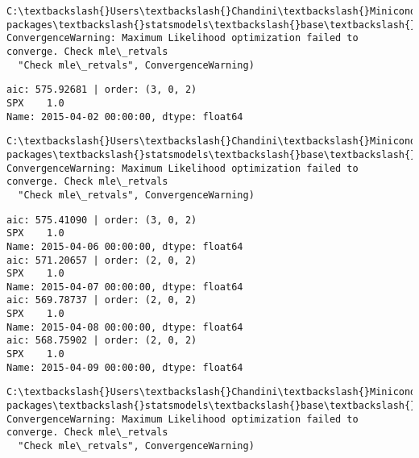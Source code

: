 \documentclass[11pt]{article}
\begin{document}
    \begin{Verbatim}[commandchars=\\\{\}]
C:\textbackslash{}Users\textbackslash{}Chandini\textbackslash{}Miniconda3\textbackslash{}envs\textbackslash{}auquan\textbackslash{}lib\textbackslash{}site-packages\textbackslash{}statsmodels\textbackslash{}base\textbackslash{}model.py:496: ConvergenceWarning: Maximum Likelihood optimization failed to converge. Check mle\_retvals
  "Check mle\_retvals", ConvergenceWarning)

    \end{Verbatim}

    \begin{Verbatim}[commandchars=\\\{\}]
aic: 575.92681 | order: (3, 0, 2)
SPX    1.0
Name: 2015-04-02 00:00:00, dtype: float64

    \end{Verbatim}

    \begin{Verbatim}[commandchars=\\\{\}]
C:\textbackslash{}Users\textbackslash{}Chandini\textbackslash{}Miniconda3\textbackslash{}envs\textbackslash{}auquan\textbackslash{}lib\textbackslash{}site-packages\textbackslash{}statsmodels\textbackslash{}base\textbackslash{}model.py:496: ConvergenceWarning: Maximum Likelihood optimization failed to converge. Check mle\_retvals
  "Check mle\_retvals", ConvergenceWarning)

    \end{Verbatim}

    \begin{Verbatim}[commandchars=\\\{\}]
aic: 575.41090 | order: (3, 0, 2)
SPX    1.0
Name: 2015-04-06 00:00:00, dtype: float64
aic: 571.20657 | order: (2, 0, 2)
SPX    1.0
Name: 2015-04-07 00:00:00, dtype: float64
aic: 569.78737 | order: (2, 0, 2)
SPX    1.0
Name: 2015-04-08 00:00:00, dtype: float64
aic: 568.75902 | order: (2, 0, 2)
SPX    1.0
Name: 2015-04-09 00:00:00, dtype: float64

    \end{Verbatim}

    \begin{Verbatim}[commandchars=\\\{\}]
C:\textbackslash{}Users\textbackslash{}Chandini\textbackslash{}Miniconda3\textbackslash{}envs\textbackslash{}auquan\textbackslash{}lib\textbackslash{}site-packages\textbackslash{}statsmodels\textbackslash{}base\textbackslash{}model.py:496: ConvergenceWarning: Maximum Likelihood optimization failed to converge. Check mle\_retvals
  "Check mle\_retvals", ConvergenceWarning)

    \end{Verbatim}
\end{document}
